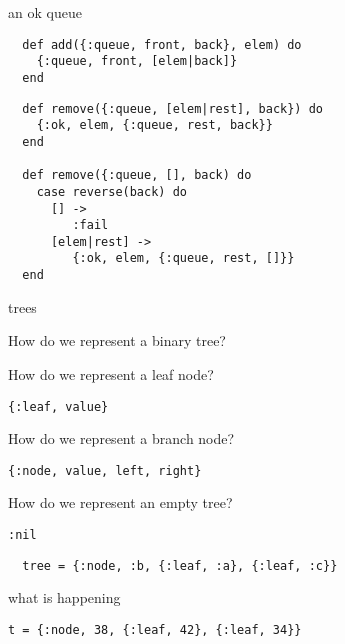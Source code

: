 \begin{frame}[fragile]{an ok queue}

\begin{verbatim}
  def add({:queue, front, back}, elem) do
    {:queue, front, [elem|back]}
  end
\end{verbatim}

\begin{verbatim}
  def remove({:queue, [elem|rest], back}) do
    {:ok, elem, {:queue, rest, back}}
  end

  def remove({:queue, [], back) do 
    case reverse(back) do
      [] -> 
         :fail
      [elem|rest] ->
         {:ok, elem, {:queue, rest, []}}
  end
\end{verbatim}
  
\end{frame}


\begin{frame}[fragile]{trees}

\pause How do we represent a binary tree?

\vspace{10pt}
\pause How do we represent a leaf node?

\vspace{10pt}
{\tt \{:leaf, value\}}

\vspace{20pt}
\pause How do we represent a branch node?

\vspace{10pt}
{\tt \{:node, value, left, right\}}

\vspace{10pt}
\pause How do we represent an empty tree?

\vspace{10pt}
{\tt :nil}

\vspace{10pt}

\begin{verbatim}
  tree = {:node, :b, {:leaf, :a}, {:leaf, :c}}
\end{verbatim}

\end{frame}


\begin{frame}{what is happening}

{\tt t = \{:node, 38, \{:leaf, 42\}, \{:leaf, 34\}\}}

\pause \vspace{20pt}


\end{frame}

